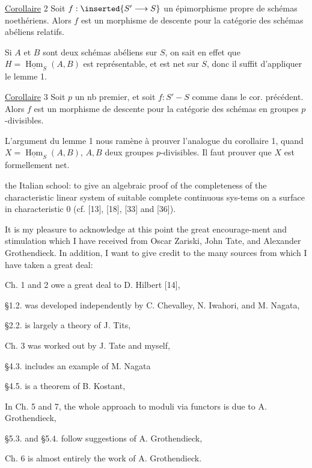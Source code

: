 \uline{Corollaire} 2 Soit $f:\inserted{S'\longrightarrow S}$ un épimorphisme propre de schémas noethériens. Alors $f$ est un morphisme de descente pour la catégorie des schémas abéliens relatifs.

Si $A$ et $B$ sont deux schémas abéliens sur $S$, on sait en effet que $H=\underline{\operatorname{Hom}}_S(A,B)$ est représentable, et est net sur $S$, donc il suffit d'appliquer le lemme 1.

\uline{Corollaire} 3 Soit $p$ un nb premier, et soit $f:S'\mathbin{-}S$ comme dans le cor. précédent. Alors $f$ est un morphisme de descente pour la catégorie des  schémas en groupes $p$-divisibles.

L'argument  du lemme 1 nous ramène à prouver l'analogue du corollaire 1, quand $X=\underline{\operatorname{Hom}}_S(A,B)$, $A,B$ deux groupes $p$-divisibles. Il faut prouver que $X$ est formellement net.

the Italian school: to give an algebraic proof of the completeness of the characteristic linear system of suitable complete continuous sys-tems on a surface in characteristic 0 (cf. [13], [18], [33] and [36]).

It is my pleasure to acknowledge at this point the great encourage-ment and stimulation which I have received from Oscar Zariski, John Tate, and Alexander Grothendieck. In addition, I want to give credit to the many sources from which I have taken a great deal:

Ch. 1 and 2 owe a great deal to D. Hilbert [14],

\S1.2. was developed independently by C. Chevalley, N. Iwahori, and M. Nagata,

\S2.2. is largely a theory of J. Tits,

Ch. 3 was worked out by J. Tate and myself,

\S4.3. includes an example of M. Nagata

\S4.5. is a theorem of B. Kostant,

In Ch. 5 and 7, the whole approach to moduli via functors is due to A. Grothendieck,

\S5.3. and \S5.4. follow suggestions of A. Grothendieck,

Ch. 6 is almost entirely the work of A. Grothendieck.

